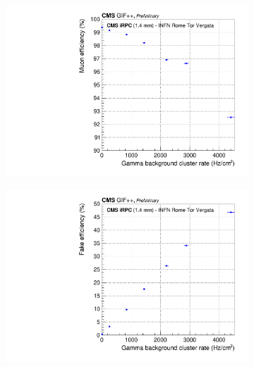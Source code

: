 \begin{figure}[H]
\begin{subfigure}{.5\linewidth}
			\includegraphics[width = \linewidth]{fig/chapt6/CMS-iRPC-INFN-MuonEfficiency_vs_Rate.pdf}
			\caption{\label{fig:iRPC_INFN_perf:C}}
		\end{subfigure}
		\begin{subfigure}{.5\linewidth}
		    \centering
			\includegraphics[width = \linewidth]{fig/chapt6/CMS-iRPC-INFN-FakeEfficiency_vs_Rate.pdf}
			\caption{\label{fig:iRPC_INFN_perf:D}}
		\end{subfigure}
		\caption{\label{fig:iRPC_INFN_perf} }
    \end{figure}
	 
